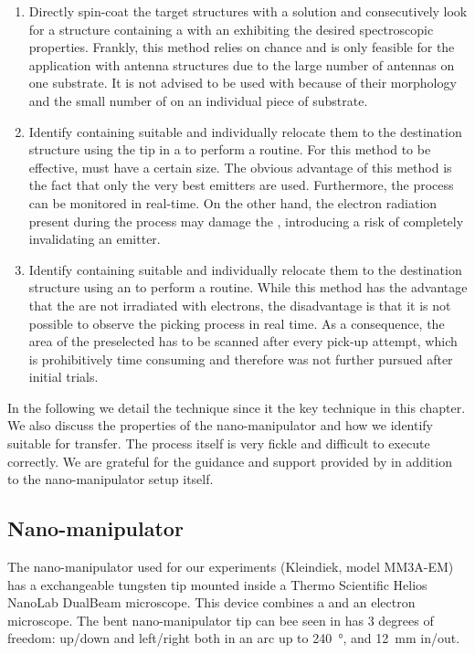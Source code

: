 	\begin{enumerate}
		\item Directly spin-coat the target structures with a \nd solution and consecutively look for a structure containing a \nd with an \siv exhibiting the desired spectroscopic properties. Frankly, this method relies on chance and is only feasible for the application with antenna structures due to the large number of antennas on one substrate. It is not advised to be used with \VCSELs because of their morphology and the small number of \VCSELs on an individual piece of substrate.

		\item Identify \nds containing suitable \sivs and individually relocate them to the destination structure using the tip in a \sem to perform a \pp routine. For this method to be effective, \nds must have a certain size. The obvious advantage of this method is the fact that only the very best emitters are used. Furthermore, the \pp process can be monitored in real-time. On the other hand, the electron radiation present during the \pp process may damage the \siv, introducing a risk of completely invalidating an emitter.

		\item Identify \nds containing suitable \sivs and individually relocate them to the destination structure using an \afm to perform a \pp routine. While this method has the advantage that the \nds are not irradiated with electrons, the disadvantage is that it is not possible to  observe the picking process in real time. As a consequence, the area of the preselected \nd has to be scanned after every pick-up attempt, which is prohibitively time consuming and therefore was not further pursued after initial trials.
	\end{enumerate}

		In the following we detail the \pp technique since it the key technique in this chapter. We also discuss the properties of the nano-manipulator and how we identify \nds suitable for \pp transfer. The \pp process itself is very fickle and difficult to execute correctly. We are grateful for the guidance and support provided by \pauly in addition to the nano-manipulator setup itself.
		\\
	\subsection{Nano-manipulator} \label{subsec::nanomanipulator}

		The nano-manipulator used for our experiments (Kleindiek, model MM3A-EM) has a exchangeable tungsten tip
	  mounted inside a Thermo Scientific\texttrademark{} Helios NanoLab\texttrademark{} DualBeam\texttrademark{} microscope. This device combines a \fib and an electron microscope.
		The bent nano-manipulator tip can bee seen in  has $3$ degrees of freedom: up/down and left/right both in an arc up to \SI{240}{\degree}, and \SI{12}{\milli\metre} in/out.

